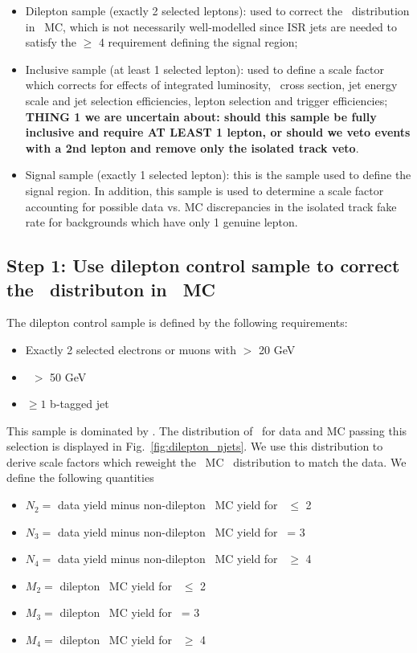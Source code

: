 \begin{itemize}
\item Dilepton sample (exactly 2 selected leptons): used to correct the \njets\ distribution in \ttll\ MC, which is not necessarily well-modelled since ISR jets 
are needed to satisfy the \njets $\geq$ 4 requirement defining the signal region;
\item Inclusive sample (at least 1 selected lepton): used to define a scale factor which corrects for effects of integrated luminosity, \ttbar\ cross section,
jet energy scale and jet selection efficiencies, lepton selection and trigger efficiencies; 
{\bf THING 1 we are uncertain about: should this sample be fully inclusive and require AT LEAST 1 lepton, or should we veto events with a 2nd lepton and remove only the isolated track veto}.
\item Signal sample (exactly 1 selected lepton): this is the sample used to define the signal region. In addition, this sample is used to determine a scale 
factor accounting for possible data vs. MC discrepancies in the isolated track fake rate for backgrounds which have only 1 genuine lepton.
\end{itemize}

\subsection{Step 1: Use dilepton control sample to correct the \njets\ distributon in \ttll\ MC}

The dilepton control sample is defined by the following requirements:
\begin{itemize}
\item Exactly 2 selected electrons or muons with \pt $>$ 20 GeV
\item \met\ $>$ 50 GeV
\item $\geq1$ b-tagged jet
\end{itemize}

This sample is dominated by \ttll. The distribution of \njets\ for data and MC passing this selection is displayed in Fig.~\ref{fig:dilepton_njets}. 
We use this distribution to derive scale factors which reweight the \ttll\ MC \njets\ distribution to match the data. We define the following
quantities

\begin{itemize}
\item $N_{2}=$ data yield minus non-dilepton \ttbar\ MC yield for \njets\ $\leq$ 2
\item $N_{3}=$ data yield minus non-dilepton \ttbar\ MC yield for \njets\ = 3
\item $N_{4}=$ data yield minus non-dilepton \ttbar\ MC yield for \njets\ $\geq$ 4
\item $M_{2}=$ dilepton \ttbar\ MC yield for \njets\ $\leq$ 2
\item $M_{3}=$ dilepton \ttbar\ MC yield for \njets\ = 3
\item $M_{4}=$ dilepton \ttbar\ MC yield for \njets\ $\geq$ 4
\end{itemize}

